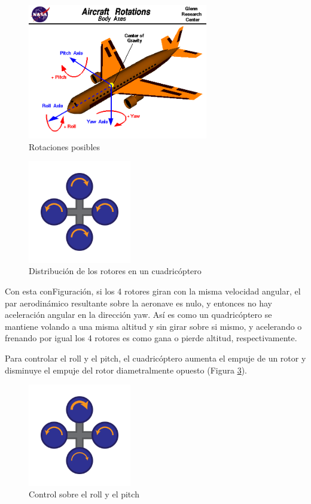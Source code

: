 \documentclass[12pt,twoside]{article}
\begin{document}
		\begin{figure}
			\centering
			\includegraphics[width=0.7\textwidth]{Imatges/Funcionament/rotations.png}
			\caption{Rotaciones posibles}
			\label{fig:rotations}
		\end{figure}
		
		\begin{figure}
			\centering
			\includegraphics[width=0.4\textwidth]{Imatges/Funcionament/quadrotorhover.png}
			\caption{Distribución de los rotores en un cuadricóptero}
			\label{fig:quadrotorhover}
		\end{figure}
		
		Con esta conFiguración, si los 4 rotores giran con la misma velocidad angular, el par aerodinámico resultante sobre la aeronave es nulo, y entonces no hay aceleración angular en la dirección yaw. Así es como un quadricóptero se mantiene volando a una misma altitud y sin girar sobre si mismo, y acelerando o frenando por igual los 4 rotores es como gana o pierde altitud, respectivamente. 
		
		Para controlar el roll y el pitch, el cuadricóptero aumenta el empuje de un rotor y disminuye el empuje del rotor diametralmente opuesto (Figura \ref{fig:quadrotorpitch_androll}).
		
		\begin{figure}
			\centering
			\includegraphics[width=0.4\textwidth]{Imatges/Funcionament/quadrotorpitch_androll.png}
			\caption{Control sobre el roll y el pitch}
			\label{fig:quadrotorpitch_androll}
		\end{figure}
		
\end{document}
